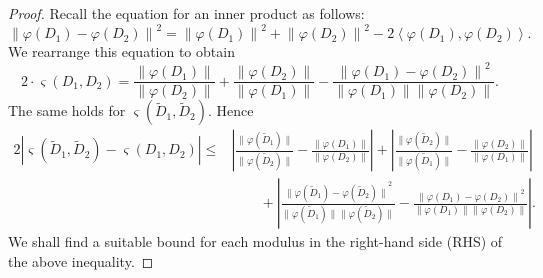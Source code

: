 \documentclass[sn-mathphys-num]{sn-jnl}%
\theoremstyle{thmstyleone}%
\theoremstyle{thmstyletwo}%
\theoremstyle{thmstylethree}%
\begin{document}
\begin{proof}
	Recall the equation for an inner product as follows:
	\begin{equation}\label{equation: inspiration variation}
		\left\|\varphi(D_1)-\varphi(D_2)\right\|^2=\left\|\varphi(D_1)\right\|^2+\left\|\varphi(D_2)\right\|^2-2\left\langle\varphi(D_1), \varphi(D_2)\right\rangle.
	\end{equation}
	We rearrange this equation to obtain
	\begin{equation*}
		2 \cdot \varsigma(D_1, D_2)=\frac{\left\|\varphi(D_1)\right\|}{\left\|\varphi(D_2)\right\|}+\frac{\left\|\varphi(D_2)\right\|}{\left\|\varphi(D_1)\right\|}-\frac{\left\|\varphi(D_1)-\varphi(D_2)\right\|^2}{\left\|\varphi(D_1)\right\|\left\|\varphi(D_2)\right\|}.
	\end{equation*}
	The same holds for $\varsigma(\tilde{D}_1, \tilde{D}_2)$. Hence
	\begin{align*}
		2 \left|\varsigma(\tilde{D}_1, \tilde{D}_2)-\varsigma(D_1, D_2)\right| \leq & \left|\frac{\|\varphi(\tilde{D}_1)\|}{\|\varphi(\tilde{D}_2)\|}-\frac{\|\varphi(D_1)\|}{\|\varphi(D_2)\|}\right|
		+\left|\frac{\|\varphi(\tilde{D}_2)\|}{\|\varphi(\tilde{D}_1)\|}-\frac{\|\varphi(D_2)\|}{\|\varphi(D_1)\|}\right| \\
		& \qquad +\left|\frac{{\|\varphi(\tilde{D}_1)-\varphi(\tilde{D}_2)\|}^2}{\|\varphi(\tilde{D}_1)\|\|\varphi(\tilde{D}_2)\|}-\frac{{\|\varphi(D_1)-\varphi(D_2)\|}^2}{\|\varphi(D_1)\|\|\varphi(D_2)\|}\right|.
	\end{align*}
	We shall find a suitable bound for each modulus in the right-hand side (RHS) of the above inequality.
	

\end{proof}
\end{document}
